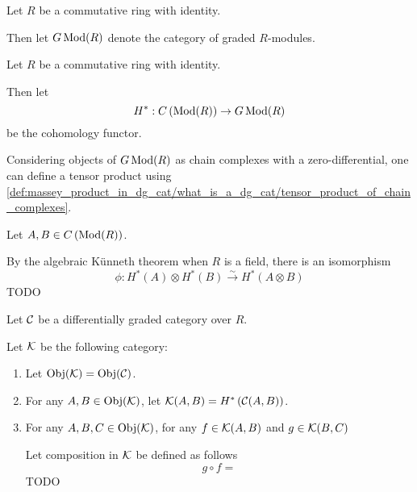 \begin{notation}
    Let \( R \) be a commutative ring with identity.

    Then let \( G \operatorname{Mod}(R) \) denote the category of graded \( R \)-modules.
\end{notation}

\begin{notation}
    Let \( R \) be a commutative ring with identity.

    Then let
    \[
        H^*: C \left( \operatorname{Mod}(R) \right) \to G \operatorname{Mod}(R)
    \]
    be the cohomology functor.
\end{notation}

\begin{fact}
    Considering objects of \( G \operatorname{Mod}(R) \) as chain complexes with a zero-differential, one can define a tensor product using \autoref{def:massey_product_in_dg_cat/what_is_a_dg_cat/tensor_product_of_chain_complexes}.

    Let \( A, B \in C \left( \operatorname{Mod}(R) \right) \).

    By the algebraic Künneth theorem when \( R \) is a field, there is an isomorphism
    \[
        \phi: H^*(A) \otimes H^*(B) \stackrel{\sim}{\to} H^*(A \otimes B)
    \]
    TODO
\end{fact}

\begin{definition}
    Let \( {\mathcal{C}} \) be a differentially graded category over \( R \).

    Let \( {\mathcal{K}} \) be the following category:
    \begin{enumerate}
        \item Let \( \operatorname{Obj}({\mathcal{K}}) = \operatorname{Obj}({\mathcal{C}}) \).
        \item For any \( A, B \in \operatorname{Obj}({\mathcal{K}}) \), let \( {\mathcal{K}}(A, B) = H^* \left( {\mathcal{C}}(A, B) \right) \).
        \item {
            For any \( A, B, C \in \operatorname{Obj}({\mathcal{K}}) \), for any \( f \in {\mathcal{K}}(A, B) \) and \( g \in {\mathcal{K}}(B, C) \)

            Let composition in \( {\mathcal{K}} \) be defined as follows
            \[
                g \circ f = 
            \]
            TODO
        }
    \end{enumerate}
\end{definition}

